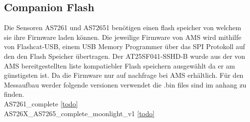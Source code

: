\subsection{Companion Flash}
Die Sensoren AS7261 und AS72651 benötigen einen flash speicher von welchem sie ihre Firmware laden können.
Die jeweilige Firmware von AMS wird mithilfe von Flashcat-USB, einem USB Memory Programmer über das SPI Protokoll auf den den Flash Speicher übertragen.
Der AT25SF041-SSHD-B wurde aus der von AMS bereitgestellten liste kompatiebler Flash speichern ausgewählt da er am günstigsten ist. 
Da die Firmware nur auf nachfrage bei AMS erhältlich. Für den Messaufbau werder folgende versionen verwendet die .bin files sind im anhang zu finden.\\
AS7261\_complete \ref{todo}\\
AS726X\_AS7265\_complete\_moonlight\_v1 \ref{todo}



